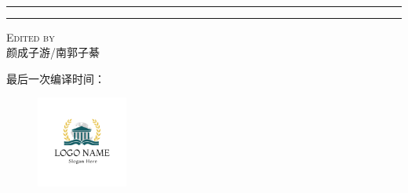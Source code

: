 \begin{titlepage}
\vspace{0.75\baselineskip} %

{\huge \calligra{ \textbf{} }\\} %

\vspace{0.75\baselineskip} %

\rule{\textwidth}{0.4pt}\vspace*{-\baselineskip}\vspace{3.2pt} %
\rule{\textwidth}{1.6pt} %

\vspace{2\baselineskip} %


\LARGE{} 

\vspace*{3\baselineskip} %



\vspace{0.5\baselineskip} 

{\scshape   \LARGE Edited by\\  颜成子游/南郭子綦} %
\vspace{0.2\baselineskip} 


\vfill 
{最后一次编译时间：\DTMnow}

\begin{figure}[!h]
    \centering
    \includegraphics[width = 3cm, height= 3cm]{resource/icon.png}%
\end{figure}
\vspace{0.3\baselineskip} 

\end{titlepage}
